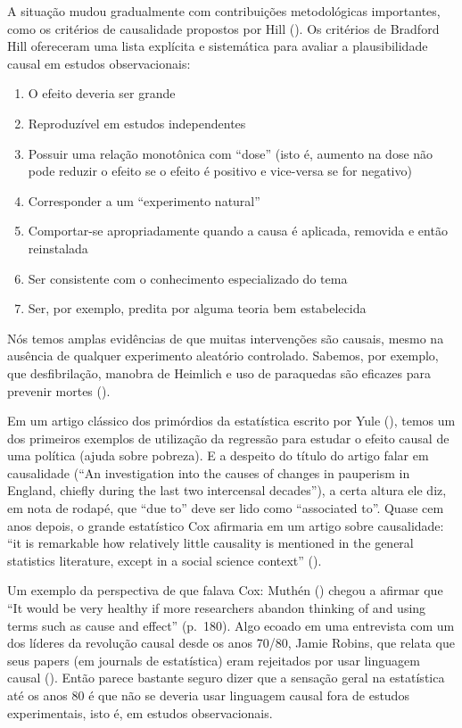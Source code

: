 \documentclass[
]{article}
\providecommand{\tightlist}{%
  \setlength{\itemsep}{0pt}\setlength{\parskip}{0pt}}
\begin{document}
A situação mudou gradualmente com contribuições metodológicas importantes, como os critérios de causalidade propostos por Hill (). Os critérios de Bradford Hill ofereceram uma lista explícita e sistemática para avaliar a plausibilidade causal em estudos observacionais:

\begin{enumerate}
\def\labelenumi{\arabic{enumi}.}
\tightlist
\item
  O efeito deveria ser grande
\item
  Reproduzível em estudos independentes
\item
  Possuir uma relação monotônica com ``dose'' (isto é, aumento na dose não pode reduzir o efeito se o efeito é positivo e vice-versa se for negativo)
\item
  Corresponder a um ``experimento natural''
\item
  Comportar-se apropriadamente quando a causa é aplicada, removida e então reinstalada
\item
  Ser consistente com o conhecimento especializado do tema
\item
  Ser, por exemplo, predita por alguma teoria bem estabelecida
\end{enumerate}

Nós temos amplas evidências de que muitas intervenções são causais, mesmo na ausência de qualquer experimento aleatório controlado. Sabemos, por exemplo, que desfibrilação, manobra de Heimlich e uso de paraquedas são eficazes para prevenir mortes ().

Em um artigo clássico dos primórdios da estatística escrito por Yule (), temos um dos primeiros exemplos de utilização da regressão para estudar o efeito causal de uma política (ajuda sobre pobreza). E a despeito do título do artigo falar em causalidade (``An investigation into the causes of changes in pauperism in England, chiefly during the last two intercensal decades''), a certa altura ele diz, em nota de rodapé, que ``due to'' deve ser lido como ``associated to''. Quase cem anos depois, o grande estatístico Cox afirmaria em um artigo sobre causalidade: ``it is remarkable how relatively little causality is mentioned in the general statistics literature, except in a social science context'' ().

Um exemplo da perspectiva de que falava Cox: Muthén () chegou a afirmar que ``It would be very healthy if more researchers abandon thinking of and using terms such as cause and effect'' (p.~180). Algo ecoado em uma entrevista com um dos líderes da revolução causal desde os anos 70/80, Jamie Robins, que relata que seus papers (em journals de estatística) eram rejeitados por usar linguagem causal (). Então parece bastante seguro dizer que a sensação geral na estatística até os anos 80 é que não se deveria usar linguagem causal fora de estudos experimentais, isto é, em estudos observacionais.
\end{document}
